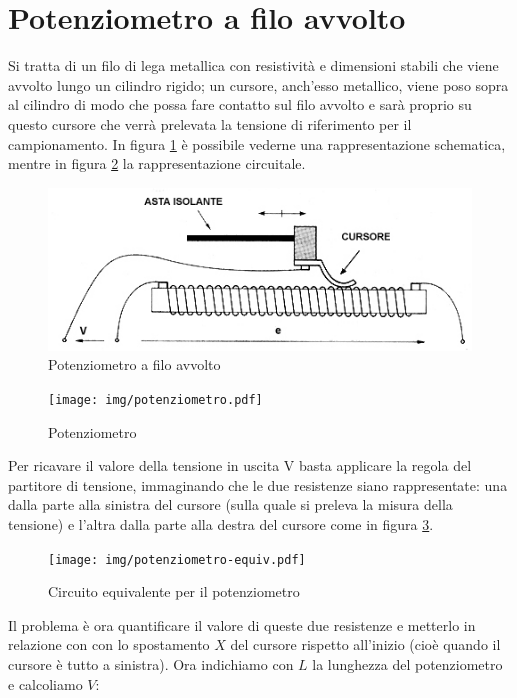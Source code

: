\section{Potenziometro a filo avvolto}\label{sec:filoavvolto}
Si tratta di un filo di lega metallica con resistività e dimensioni
stabili che viene avvolto lungo un cilindro rigido; un cursore,
anch'esso metallico, viene poso sopra al cilindro di modo che possa
fare contatto sul filo avvolto e sarà proprio su questo cursore che
verrà prelevata la tensione di riferimento per il campionamento. In
figura \ref{fig:filoavvolto} è possibile vederne una
rappresentazione schematica, mentre in figura \ref{fig:potenziometro}
la rappresentazione circuitale.

\begin{figure}[htbp]
	\centering
	\includegraphics[scale=0.5]
			{img/filoavvolto.png}
	\caption{Potenziometro a filo avvolto\label{fig:filoavvolto}}
\end{figure}

\begin{figure}[htbp]
	\centering
	\texttt{[image: img/potenziometro.pdf]}
	\caption{Potenziometro\label{fig:potenziometro}}
\end{figure}

Per ricavare il valore della tensione in uscita V basta applicare la
regola del partitore di tensione, immaginando che le due resistenze
siano rappresentate: una dalla parte alla sinistra del cursore (sulla
quale si preleva la misura della tensione) e l'altra dalla parte alla
destra del cursore come in figura \ref{fig:potenziometroequiv}.

\begin{figure}[htbp]
	\centering
	\texttt{[image: img/potenziometro-equiv.pdf]}
	\caption{Circuito equivalente
per il potenziometro\label{fig:potenziometroequiv}}
\end{figure}

Il problema è ora quantificare il valore di queste
due resistenze e metterlo in relazione con con lo spostamento $X$ del
cursore rispetto all'inizio (cioè quando il cursore è tutto a
sinistra). Ora indichiamo con $L$ la lunghezza del potenziometro e
calcoliamo $V$:

